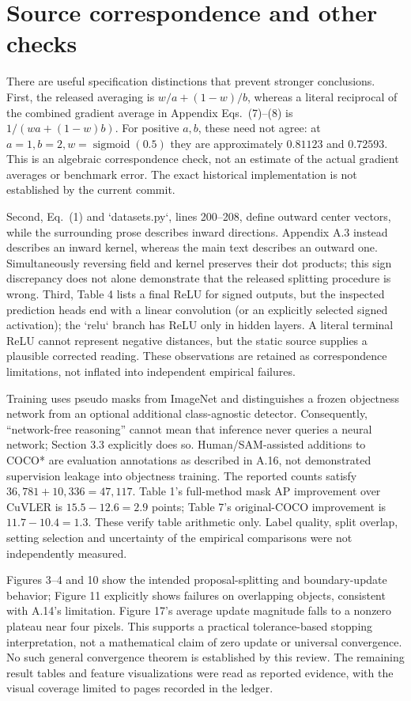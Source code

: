 \documentclass[10pt]{article}
\begin{document}
\section*{Source correspondence and other checks}
There are useful specification distinctions that prevent stronger conclusions. First, the released averaging is \(w/a+(1-w)/b\), whereas a literal reciprocal of the combined gradient average in Appendix Eqs. (7)–(8) is \(1/(wa+(1-w)b)\). For positive \(a,b\), these need not agree: at \(a=1,b=2,w=\operatorname{sigmoid}(0.5)\) they are approximately \(0.81123\) and \(0.72593\). This is an algebraic correspondence check, not an estimate of the actual gradient averages or benchmark error. The exact historical implementation is not established by the current commit.\par
Second, Eq. (1) and `datasets.py`, lines 200–208, define outward center vectors, while the surrounding prose describes inward directions. Appendix A.3 instead describes an inward kernel, whereas the main text describes an outward one. Simultaneously reversing field and kernel preserves their dot products; this sign discrepancy does not alone demonstrate that the released splitting procedure is wrong. Third, Table 4 lists a final ReLU for signed outputs, but the inspected prediction heads end with a linear convolution (or an explicitly selected signed activation); the `relu` branch has ReLU only in hidden layers. A literal terminal ReLU cannot represent negative distances, but the static source supplies a plausible corrected reading. These observations are retained as correspondence limitations, not inflated into independent empirical failures.\par
Training uses pseudo masks from ImageNet and distinguishes a frozen objectness network from an optional additional class-agnostic detector. Consequently, “network-free reasoning” cannot mean that inference never queries a neural network; Section 3.3 explicitly does so. Human/SAM-assisted additions to COCO* are evaluation annotations as described in A.16, not demonstrated supervision leakage into objectness training. The reported counts satisfy \(36{,}781+10{,}336=47{,}117\). Table 1’s full-method mask AP improvement over CuVLER is \(15.5-12.6=2.9\) points; Table 7’s original-COCO improvement is \(11.7-10.4=1.3\). These verify table arithmetic only. Label quality, split overlap, setting selection and uncertainty of the empirical comparisons were not independently measured.\par
Figures 3–4 and 10 show the intended proposal-splitting and boundary-update behavior; Figure 11 explicitly shows failures on overlapping objects, consistent with A.14’s limitation. Figure 17’s average update magnitude falls to a nonzero plateau near four pixels. This supports a practical tolerance-based stopping interpretation, not a mathematical claim of zero update or universal convergence. No such general convergence theorem is established by this review. The remaining result tables and feature visualizations were read as reported evidence, with the visual coverage limited to pages recorded in the ledger.\par
\end{document}
